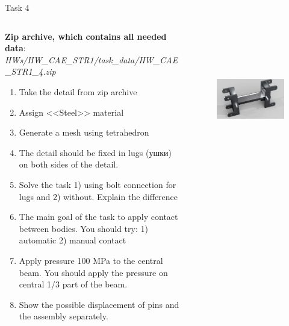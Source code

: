 \documentclass[aspectratio=169]{beamer}
\newcommand{\fbckg}[1]{\usebackgroundtemplate{\texttt{[image: \#1]}}}%
\begin{document}
\begin{frame}[t]{Task 4}
    \vspace{-0.4cm}
    \begin{columns}[T,onlytextwidth]
        \begin{column}{0.54\textwidth}
            \scriptsize
            \textbf{Zip archive, which contains all needed data}: \textit{HWs/HW\_CAE\_STR1/task\_data/HW\_CAE\_STR1\_4.zip}
            \begin{enumerate}
                \item Take the detail from zip archive
                \item Assign <<Steel>> material
                \item Generate a mesh using tetrahedron
                \item The detail should be fixed in lugs (ушки) on both sides of the detail. 
                \item Solve the task 1) using bolt connection for lugs and 2) without. Explain the difference
                \item The main goal of the task to apply contact between bodies. You should try: 1) automatic 2) manual contact
                \item Apply pressure 100 MPa to the central beam. You should apply the pressure on central 1/3 part of the beam.
                \item Show the possible displacement of pins and the assembly separately.
            \end{enumerate}
        \end{column}
        \begin{column}{0.45\textwidth}
            \vspace{0.5cm}
            \begin{figure}[H]
                \centering\includegraphics[height=6cm,width=1\textwidth,keepaspectratio]{HW_CAE_STR1_4.png}
                \label{fig:HW_CAE_STR1_4.png}
            \end{figure}
        \end{column}
    \end{columns}
\end{frame}

\fbckg{fibeamer/figs/last_page.png}
\frame[plain]{}
\end{document}
